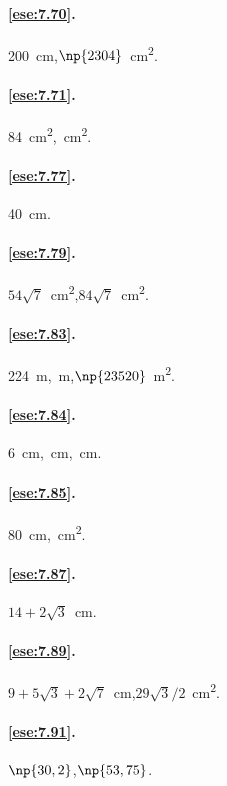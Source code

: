 \paragraph{\ref{ese:7.70}.}
200~cm,\quad $\np{2304}$~cm\textsuperscript{2}.

\paragraph{\ref{ese:7.71}.}
84~cm\textsuperscript{2},~cm\textsuperscript{2}.

\paragraph{\ref{ese:7.77}.}
40~cm.

\paragraph{\ref{ese:7.79}.}
$54\sqrt{7}$~cm\textsuperscript{2},\quad $84\sqrt{7}$~cm\textsuperscript{2}.

\paragraph{\ref{ese:7.83}.}
224~m,~m,\quad $\np{23520}$~m\textsuperscript{2}.

\paragraph{\ref{ese:7.84}.}
6~cm,~cm,~cm.

\paragraph{\ref{ese:7.85}.}
80~cm,~cm\textsuperscript{2}.

\paragraph{\ref{ese:7.87}.}
$14 + 2\sqrt{3}$~cm.

\paragraph{\ref{ese:7.89}.}
$9 + 5\sqrt{3} + 2\sqrt{7}$~cm,\quad $29\sqrt{3}/2$~cm\textsuperscript{2}.

\paragraph{\ref{ese:7.91}.}
$\np{30,2}$,\quad $\np{53,75}$.

